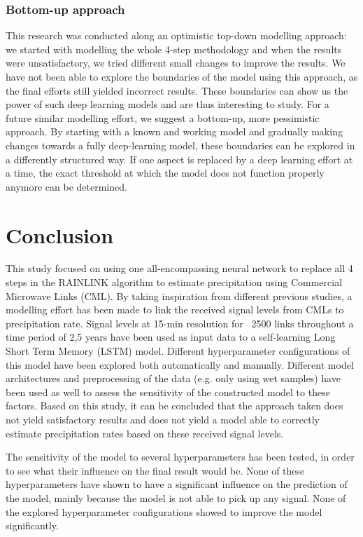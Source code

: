 \documentclass[twocolumn, 10pt, a4paper]{memoir}
\begin{document}
	\subsection*{Bottom-up approach}
	This research was conducted along an optimistic top-down modelling approach: we started with modelling the whole 4-step methodology and when the results were unsatisfactory, we tried different small changes to improve the results. We have not been able to explore the boundaries of the model using this approach, as the final efforts still yielded incorrect results. These boundaries can show us the power of such deep learning models and are thus interesting to study. For a future similar modelling effort, we suggest a bottom-up, more pessimistic approach. By starting with a known and working model and gradually making changes towards a fully deep-learning model, these boundaries can be explored in a differently structured way. If one aspect is replaced by a deep learning effort at a time, the exact threshold at which the model does not function properly anymore can be determined.  
	
	

	
	\chapter{Conclusion} \label{ch: conclusion}
	This study focused on using one all-encompassing neural network to replace all 4 steps in the RAINLINK algorithm to estimate precipitation using Commercial Microwave Links (CML). By taking inspiration from different previous studies, a modelling effort has been made to link the received signal levels from CMLs to precipitation rate. Signal levels at 15-min resolution for ~2500 links throughout a time period of 2,5 years have been used as input data to a self-learning Long Short Term Memory (LSTM) model. Different hyperparameter configurations of this model have been explored both automatically and manually. Different model architectures and preprocessing of the data (e.g. only using wet samples) have been used as well to assess the sensitivity of the constructed model to these factors. Based on this study, it can be concluded that the approach taken does not yield satisfactory results and does not yield a model able to correctly estimate precipitation rates based on these received signal levels.
	
	The sensitivity of the model to several hyperparameters has been tested, in order to see what their influence on the final result would be. None of these hyperparameters have shown to have a significant influence on the prediction of the model, mainly because the model is not able to pick up any signal. None of the explored hyperparameter configurations showed to improve the model significantly. 
	
\end{document}
